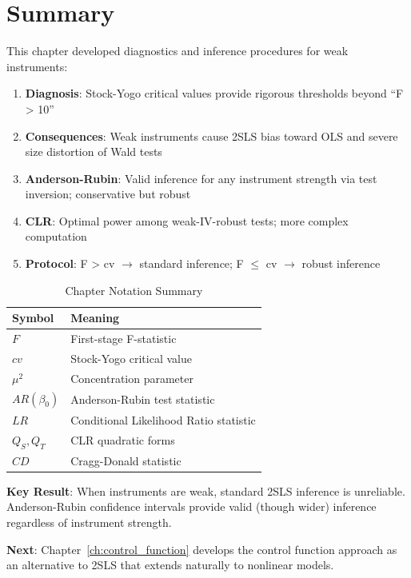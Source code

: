 \section{Summary}
\label{sec:weak_iv_summary}

This chapter developed diagnostics and inference procedures for weak instruments:

\begin{enumerate}
    \item \textbf{Diagnosis}: Stock-Yogo critical values provide rigorous thresholds beyond ``F > 10''

    \item \textbf{Consequences}: Weak instruments cause 2SLS bias toward OLS and severe size distortion of Wald tests

    \item \textbf{Anderson-Rubin}: Valid inference for any instrument strength via test inversion; conservative but robust

    \item \textbf{CLR}: Optimal power among weak-IV-robust tests; more complex computation

    \item \textbf{Protocol}: F > cv $\to$ standard inference; F $\leq$ cv $\to$ robust inference
\end{enumerate}

\begin{table}[htbp]
\centering
\caption{Chapter Notation Summary}
\label{tab:weak_notation}
\begin{tabular}{ll}
\toprule
Symbol & Meaning \\
\midrule
$F$ & First-stage F-statistic \\
$cv$ & Stock-Yogo critical value \\
$\mu^2$ & Concentration parameter \\
$AR(\beta_0)$ & Anderson-Rubin test statistic \\
$LR$ & Conditional Likelihood Ratio statistic \\
$Q_S, Q_T$ & CLR quadratic forms \\
$CD$ & Cragg-Donald statistic \\
\bottomrule
\end{tabular}
\end{table}

\textbf{Key Result}: When instruments are weak, standard 2SLS inference is unreliable. Anderson-Rubin confidence intervals provide valid (though wider) inference regardless of instrument strength.

\textbf{Next}: Chapter~\ref{ch:control_function} develops the control function approach as an alternative to 2SLS that extends naturally to nonlinear models.
